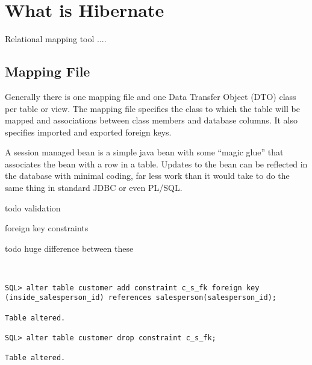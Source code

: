
\section{What is Hibernate}
Relational mapping tool ....

\subsection{Mapping File}
Generally there is one mapping file and one Data Transfer Object (DTO) class per table or view.
The mapping file specifies the class to which the table will be mapped and associations between class members and database columns.
It also specifies imported and exported foreign keys.



A session managed bean is a simple java bean with some ``magic glue'' that associates the bean with a row in a table.
Updates to the bean can be reflected in the database with minimal coding, far less work than it would take to do the same thing in 
standard JDBC or even PL/SQL.

\maketitle

todo validation

foreign key constraints


todo huge difference between these 
\begin{verbatim}


SQL> alter table customer add constraint c_s_fk foreign key
(inside_salesperson_id) references salesperson(salesperson_id);

Table altered.

SQL> alter table customer drop constraint c_s_fk;

Table altered.
 
\end{verbatim}






